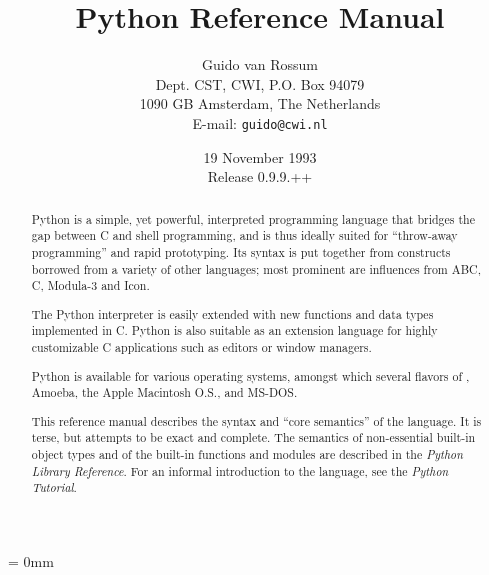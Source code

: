 
\title{\bf Python Reference Manual}

\author{
	Guido van Rossum \\
	Dept. CST, CWI, P.O. Box 94079 \\
	1090 GB Amsterdam, The Netherlands \\
	E-mail: {\tt guido@cwi.nl}
}

\date{19 November 1993 \\ Release 0.9.9.++} %

\makeindex




\maketitle

\begin{abstract}

\noindent
Python is a simple, yet powerful, interpreted programming language
that bridges the gap between C and shell programming, and is thus
ideally suited for ``throw-away programming'' and rapid prototyping.
Its syntax is put together from constructs borrowed from a variety of
other languages; most prominent are influences from ABC, C, Modula-3
and Icon.

The Python interpreter is easily extended with new functions and data
types implemented in C.  Python is also suitable as an extension
language for highly customizable C applications such as editors or
window managers.

Python is available for various operating systems, amongst which
several flavors of {\UNIX}, Amoeba, the Apple Macintosh O.S.,
and MS-DOS.

This reference manual describes the syntax and ``core semantics'' of
the language.  It is terse, but attempts to be exact and complete.
The semantics of non-essential built-in object types and of the
built-in functions and modules are described in the {\em Python
Library Reference}.  For an informal introduction to the language, see
the {\em Python Tutorial}.

\end{abstract}

\pagebreak

{
\parskip = 0mm
\tableofcontents
}

\pagebreak







